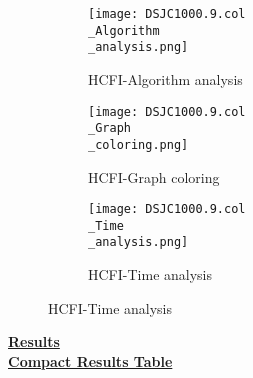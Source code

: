 \documentclass[10pt]{article}
\begin{document}
\begin{figure}[H]
\begin{subfigure}{.33\textwidth}
  \centering
  \texttt{[image: DSJC1000.9.col\\\_Algorithm\\\_analysis.png]}
  \caption{HCFI-Algorithm analysis}
   \label{fig:subfig1}
\end{subfigure}%
\begin{subfigure}{.33\textwidth}
  \centering
  \texttt{[image: DSJC1000.9.col\\\_Graph\\\_coloring.png]}
  \caption{HCFI-Graph coloring}
  \label{fig:subfig2}
\end{subfigure}
\begin{subfigure}{.33\textwidth}
  \centering
  \texttt{[image: DSJC1000.9.col\\\_Time\\\_analysis.png]}
  \caption{HCFI-Time analysis}
  \end{subfigure}
\end{figure}
\vspace{2cm}
\begin{center}
\hyperlink{page.8}{\textbf{Results}}\\
\vspace{0.5cm}
\hyperlink{page.71}{\textbf{Compact Results Table}}
\end{center}
\pagebreak
\end{document}
